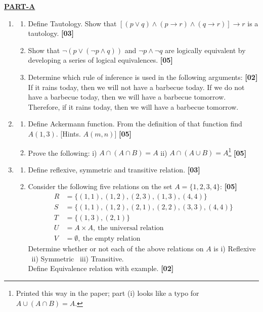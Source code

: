 \documentclass[11pt,a4paper]{article}
\newcommand{\mk}[1]{\hfill\textbf{[#1]}}
\renewcommand{\partname}[2]{\begin{center}\textbf{\underline{#1}}\\[-1pt]{\small #2}\end{center}}
\newenvironment{Ql}{\begin{enumerate}[leftmargin=2.5em,labelsep=0.4em,itemsep=5pt,topsep=2pt]}{\end{enumerate}}
\newenvironment{Sl}{\begin{enumerate}[leftmargin=2.3em,labelsep=0.3em,itemsep=3pt,topsep=2pt]}{\end{enumerate}}
\begin{document}
\partname{PART-A}{}
\begin{Ql}
\item[\textbf{1.}]
 \begin{Sl}
 \item[(a)] Define Tautology. Show that $[(p\vee q)\wedge(p\to r)\wedge(q\to r)]\to r$ is a tautology. \mk{03}
 \item[(b)] Show that $\neg(p\vee(\neg p\wedge q))$ and $\neg p\wedge\neg q$ are logically equivalent by developing a series of logical equivalences. \mk{05}
 \item[(c)] Determine which rule of inference is used in the following arguments: \mk{02}\\
  If it rains today, then we will not have a barbecue today. If we do not have a barbecue today, then we will have a barbecue tomorrow.\\
  Therefore, if it rains today, then we will have a barbecue tomorrow.
 \end{Sl}
\item[\textbf{2.}]
 \begin{Sl}
 \item[(a)] Define Ackermann function. From the definition of that function find $A(1,3)$. [Hints. $A(m,n)$] \mk{05}
 \item[(b)] Prove the following: i) $A\cap(A\cap B)=A$ \qquad ii) $A\cap(A\cup B)=A$\footnote{Printed this way in the paper; part (i) looks like a typo for $A\cup(A\cap B)=A$.} \mk{05}
 \end{Sl}
\item[\textbf{3.}]
 \begin{Sl}
 \item[(a)] Define reflexive, symmetric and transitive relation. \mk{03}
 \item[(b)] Consider the following five relations on the set $A=\{1,2,3,4\}$: \mk{05}
  \begin{align*}
  R&=\{(1,1),(1,2),(2,3),(1,3),(4,4)\}\\
  S&=\{(1,1),(1,2),(2,1),(2,2),(3,3),(4,4)\}\\
  T&=\{(1,3),(2,1)\}\\
  U&=A\times A,\ \text{the universal relation}\\
  V&=\emptyset,\ \text{the empty relation}
  \end{align*}
  Determine whether or not each of the above relations on $A$ is i) Reflexive \ ii) Symmetric \ iii) Transitive.\\
  Define Equivalence relation with example. \mk{02}
 \end{Sl}
\end{Ql}
\end{document}
